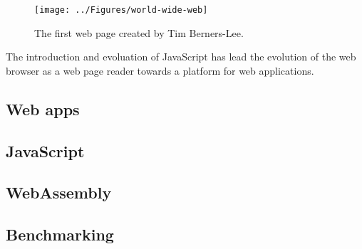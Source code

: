 


\begin{figure}[!h]
\centering
\texttt{[image: ../Figures/world-wide-web]}
\caption{The first web page created by Tim Berners-Lee.}
\label{world-wide-web}
\end{figure}

The introduction and evoluation of JavaScript has lead the evolution of the web browser as a web page reader towards a platform for web applications.

\subsection{Web apps}


\subsection{JavaScript}


\subsection{WebAssembly}


\subsection{Benchmarking}

